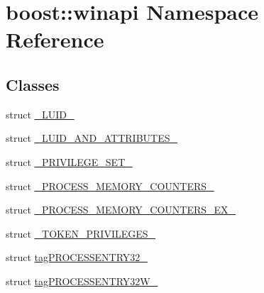 \hypertarget{namespaceboost_1_1winapi}{}\section{boost\+:\+:winapi Namespace Reference}
\label{namespaceboost_1_1winapi}
\subsection*{Classes}
\begin{DoxyCompactItemize}
\item 
struct \mbox{\hyperlink{structboost_1_1winapi_1_1___l_u_i_d__}{\+\_\+\+L\+U\+I\+D\+\_\+}}
\item 
struct \mbox{\hyperlink{structboost_1_1winapi_1_1___l_u_i_d___a_n_d___a_t_t_r_i_b_u_t_e_s__}{\+\_\+\+L\+U\+I\+D\+\_\+\+A\+N\+D\+\_\+\+A\+T\+T\+R\+I\+B\+U\+T\+E\+S\+\_\+}}
\item 
struct \mbox{\hyperlink{structboost_1_1winapi_1_1___p_r_i_v_i_l_e_g_e___s_e_t__}{\+\_\+\+P\+R\+I\+V\+I\+L\+E\+G\+E\+\_\+\+S\+E\+T\+\_\+}}
\item 
struct \mbox{\hyperlink{structboost_1_1winapi_1_1___p_r_o_c_e_s_s___m_e_m_o_r_y___c_o_u_n_t_e_r_s__}{\+\_\+\+P\+R\+O\+C\+E\+S\+S\+\_\+\+M\+E\+M\+O\+R\+Y\+\_\+\+C\+O\+U\+N\+T\+E\+R\+S\+\_\+}}
\item 
struct \mbox{\hyperlink{structboost_1_1winapi_1_1___p_r_o_c_e_s_s___m_e_m_o_r_y___c_o_u_n_t_e_r_s___e_x__}{\+\_\+\+P\+R\+O\+C\+E\+S\+S\+\_\+\+M\+E\+M\+O\+R\+Y\+\_\+\+C\+O\+U\+N\+T\+E\+R\+S\+\_\+\+E\+X\+\_\+}}
\item 
struct \mbox{\hyperlink{structboost_1_1winapi_1_1___t_o_k_e_n___p_r_i_v_i_l_e_g_e_s__}{\+\_\+\+T\+O\+K\+E\+N\+\_\+\+P\+R\+I\+V\+I\+L\+E\+G\+E\+S\+\_\+}}
\item 
struct \mbox{\hyperlink{structboost_1_1winapi_1_1tag_p_r_o_c_e_s_s_e_n_t_r_y32__}{tag\+P\+R\+O\+C\+E\+S\+S\+E\+N\+T\+R\+Y32\+\_\+}}
\item 
struct \mbox{\hyperlink{structboost_1_1winapi_1_1tag_p_r_o_c_e_s_s_e_n_t_r_y32_w__}{tag\+P\+R\+O\+C\+E\+S\+S\+E\+N\+T\+R\+Y32\+W\+\_\+}}
\end{DoxyCompactItemize}
